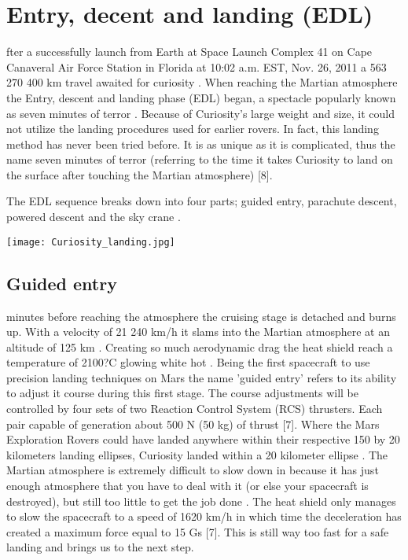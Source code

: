 \section*{Entry, decent and landing (EDL)}
fter a successfully launch from Earth at Space Launch Complex 41 on Cape Canaveral Air Force Station in Florida at 10:02 a.m. EST, Nov. 26, 2011 a 563 270 400 km travel awaited for curiosity \cite{MissionTimeline} \cite{CNNCuriosity}.
When reaching the Martian atmosphere the Entry, descent and landing phase (EDL) began, a spectacle popularly known as seven minutes of terror \cite{CNNCuriosity}.
Because of Curiosity's large weight and size, it could not utilize the landing procedures used for earlier rovers.
In fact, this landing method has never been tried before.
It is as unique as it is complicated, thus the name seven minutes of terror (referring to the time it takes Curiosity to land on the surface after touching the Martian atmosphere) [8].

The EDL sequence breaks down into four parts; guided entry, parachute descent, powered descent and the sky crane \cite{NASALanding}.

\begin{center}
\texttt{[image: Curiosity\_landing.jpg]}
\end{center}


\subsection*{Guided entry}
 minutes before reaching the atmosphere the cruising stage is detached and burns up.
With a velocity of 21 240 km/h it slams into the Martian atmosphere at an altitude of 125 km \cite{NASALanding_diag}.
Creating so much aerodynamic drag the heat shield reach a temperature of 2100?C glowing white hot \cite{NASALanding} \cite{NASA_youtube}.
Being the first spacecraft to use precision landing techniques on Mars the name 'guided entry' refers to its ability to adjust it course during this first stage.
The course adjustments will be controlled by four sets of two Reaction Control System (RCS) thrusters.
Each pair capable of generation about 500 N (50 kg) of thrust [7].
Where the Mars Exploration Rovers could have landed anywhere within their respective 150 by 20 kilometers landing ellipses, Curiosity landed within a 20 kilometer ellipse \cite{NASALanding}.
The Martian atmosphere is extremely difficult to slow down in because it has just enough atmosphere that you have to deal with it (or else your spacecraft is destroyed), but still too little to get the job done \cite{NASA_youtube}.
The heat shield only manages to slow the spacecraft to a speed of 1620 km/h in which time the deceleration has created a maximum force equal to 15 Gs \cite{NASALanding} [7].
This is still way too fast for a safe landing and brings us to the next step.


